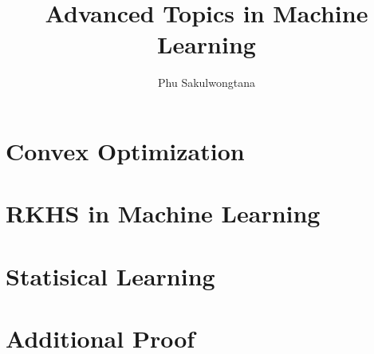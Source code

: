 \documentclass{report}
\title{Advanced Topics in Machine Learning}
\author{Phu Sakulwongtana}
\date{}
\theoremstyle{definition}
\theoremstyle{remark}
\begin{document}
\maketitle

\tableofcontents

\chapter{Convex Optimization}


\chapter{RKHS in Machine Learning}


\chapter{Statisical Learning}


\appendix
\chapter{Additional Proof}





\end{document}
